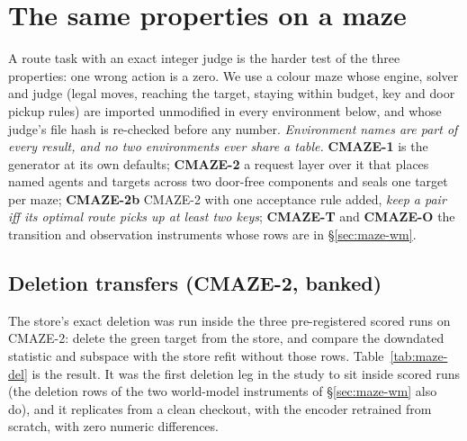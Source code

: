 \documentclass{article} %
\begin{document}
\section{The same properties on a maze}
\label{sec:maze}

A route task with an exact integer judge is the harder test of the three properties: one
wrong action is a zero. We use a colour maze whose engine, solver and judge (legal moves,
reaching the target, staying within budget, key and door pickup rules) are imported unmodified
in every environment below, and whose judge's file hash is re-checked before any number.
\emph{Environment names are part of every result, and no two environments ever share a
table.}
\textbf{CMAZE-1} is the generator at its own defaults; \textbf{CMAZE-2} a request layer over it
that places named agents and targets across two door-free components and seals one target per
maze; \textbf{CMAZE-2b} CMAZE-2 with one acceptance rule added, \emph{keep a pair iff its optimal
route picks up at least two keys}; \textbf{CMAZE-T} and \textbf{CMAZE-O} the transition and
observation instruments whose rows are in \S\ref{sec:maze-wm}.

\subsection{Deletion transfers (CMAZE-2, banked)}
\label{sec:maze-del}

The store's exact deletion was run inside the three pre-registered scored runs on CMAZE-2:
delete the green target from the store, and compare the downdated statistic and subspace with
the store refit without those rows. Table~\ref{tab:maze-del} is the result. It was the
first deletion leg in the study to sit inside scored runs (the deletion rows of the two
world-model instruments of \S\ref{sec:maze-wm} also do), and it replicates from a clean
checkout, with the encoder retrained from scratch, with zero numeric differences.
\end{document}
